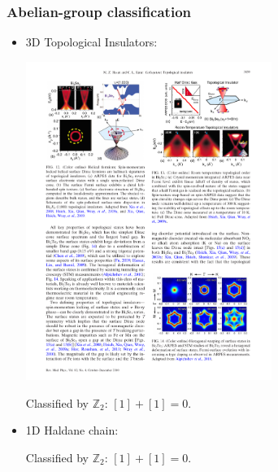 \documentclass[xcolor=table, 10pt, aspectratio=43]{beamer}
\begin{document}
\begin{frame}
	\frametitle{Abelian-group classification}
	\begin{itemize}
		\item 3D Topological Insulators:
		\begin{center}
			\includegraphics[width=8cm]{ti_surface}
		\end{center}
		Classified by $\mathbb Z_2$: $[1]+[1] = 0$.
		\item 1D Haldane chain:
		\begin{center}
		\end{center}
		Classified by $\mathbb Z_2$: $[1]+[1] = 0$.
	\end{itemize}
\end{frame}
\end{document}
